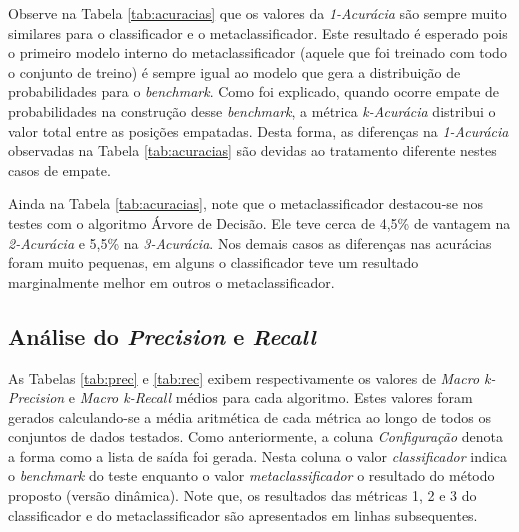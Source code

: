 Observe na Tabela \ref{tab:acuracias} que os valores da \textit{1-Acurácia} são sempre muito similares para o classificador e o metaclassificador.
Este resultado é esperado pois o primeiro modelo interno do metaclassificador (aquele que foi treinado com todo o conjunto de treino) é sempre igual ao modelo que gera a distribuição de probabilidades para o \textit{benchmark}.
Como foi explicado, quando ocorre empate de probabilidades na construção desse \textit{benchmark}, a métrica \textit{k-Acurácia} distribui o valor total entre as posições empatadas.
Desta forma, as diferenças na \textit{1-Acurácia} observadas na Tabela \ref{tab:acuracias} são devidas ao tratamento diferente nestes casos de empate.

Ainda na Tabela \ref{tab:acuracias}, note que o metaclassificador destacou-se nos testes com o algoritmo Árvore de Decisão.
Ele teve cerca de 4,5\% de vantagem na \textit{2-Acurácia} e 5,5\% na \textit{3-Acurácia}.
Nos demais casos as diferenças nas acurácias foram muito pequenas, em alguns o classificador teve um resultado marginalmente melhor em outros o metaclassificador.

\subsection{Análise do \textit{Precision} e \textit{Recall}}

As Tabelas \ref{tab:prec} e \ref{tab:rec} exibem respectivamente os valores de \textit{Macro k-Precision} e \textit{Macro k-Recall} médios para cada algoritmo.
Estes valores foram gerados calculando-se a média aritmética de cada métrica ao longo de todos os conjuntos de dados testados.
Como anteriormente, a coluna \textit{Configuração} denota a forma como a lista de saída foi gerada. 
Nesta coluna o valor \textit{classificador} indica o \textit{benchmark} do teste enquanto o valor \textit{metaclassificador} o resultado do método proposto (versão dinâmica).
Note que, os resultados das métricas 1, 2 e 3 do classificador e do metaclassificador são apresentados em linhas subsequentes.

